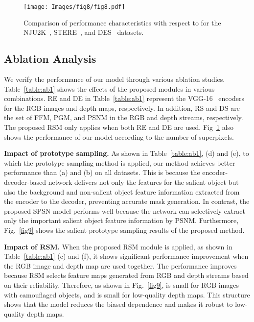 \documentclass[runningheads]{llncs}
\begin{document}
	\begin{figure}[!t]
		\setlength{\belowcaptionskip}{-24pt}
		\begin{center}
			\texttt{[image: Images/fig8/fig8.pdf]}
			\caption{Comparison of performance characteristics with respect to  for the NJU2K~\cite{ju2014depth}, STERE~\cite{niu2012leveraging}, and DES~\cite{cheng2014depth} datasets.}
			\label{fig:ab2}
		\end{center}
	\end{figure}
	
	\subsection{Ablation Analysis}
	We verify the performance of our model through various ablation studies. Table~\ref{table:ab1} shows the effects of the proposed modules in various combinations. RE and DE in Table~\ref{table:ab1} represent the VGG-16~\cite{simonyan2014very} encoders for the RGB images and depth maps, respectively. In addition, RS and DS are the set of FFM, PGM, and PSNM in the RGB and depth streams, respectively. The proposed RSM only applies when both RE and DE are used. Fig~\ref{fig:ab2} also shows the performance of our model according to the number of superpixels.
	
	\noindent
	\textbf{Impact of prototype sampling.} As shown in Table~\ref{table:ab1}, (d) and (e), to which the prototype sampling method is applied, our method achieves better performance than (a) and (b) on all datasets. This is because the encoder-decoder-based network delivers not only the features for the salient object but also the background and non-salient object feature information extracted from the encoder to the decoder, preventing accurate mask generation. In contrast, the proposed SPSN model performs well because the network can selectively extract only the important salient object feature information by PSNM. Furthermore, Fig.~\ref{fig9} shows the salient prototype sampling results of the proposed method.
	
	\noindent
	\textbf{Impact of RSM.} When the proposed RSM module is applied, as shown in Table~\ref{table:ab1} (c) and (f), it shows significant performance improvement when the RGB image and depth map are used together. The performance improves because RSM selects feature maps generated from RGB and depth streams based on their reliability. Therefore, as shown in Fig.~\ref{fig9},  is small for RGB images with camouflaged objects, and  is small for low-quality depth maps. This structure shows that the model reduces the biased dependence and makes it robust to low-quality depth maps.
	
\end{document}
